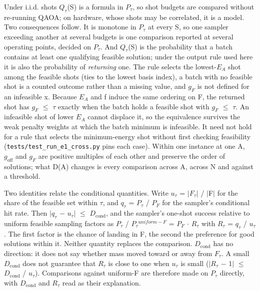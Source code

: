 \documentclass[journal]{IEEEtran}
\begin{document}
Under i.i.d. shots $Q_{\tau}$(S) is a formula in $P_{\tau}$, so shot budgets are compared without re-running QAOA; on hardware, whose shots may be correlated, it is a model. Two consequences follow. It is monotone in $P_{\tau}$ at every S, so one sampler exceeding another at several budgets is one comparison reported at several operating points, decided on $P_{\tau}$. And $Q_{\tau}$(S) is the probability that a batch contains at least one qualifying feasible solution; under the output rule used here it is also the probability of \textit{returning} one. The rule selects the lowest-$E_{A}$ shot among the feasible shots (ties to the lowest basis index), a batch with no feasible shot is a counted outcome rather than a missing value, and $g_{F}$ is not defined for an infeasible x. Because $E_{A}$ and f induce the same ordering on F, the returned shot has $g_{F}$ $\leq$ $\tau$ exactly when the batch holds a feasible shot with $g_{F}$ $\leq$ $\tau$. An infeasible shot of lower $E_{A}$ cannot displace it, so the equivalence survives the weak penalty weights at which the batch minimum is infeasible. It need not hold for a rule that selects the minimum-energy shot without first checking feasibility (\texttt{tests/test\_run\_e1\_cross.py} pins each case). Within one instance at one A, $g_{\mathrm{off}}$ and $g_{F}$ are positive multiples of each other and preserve the order of solutions; what D(A) changes is every comparison across A, across N and against a threshold.


Two identities relate the conditional quantities. Write $u_{\tau}$ = $|$$F_{\tau}$$|$ / $|$F$|$ for the share of the feasible set within $\tau$, and $q_{\tau}$ = $P_{\tau}$ / $P_{F}$ for the sampler's conditional hit rate. Then $|$$q_{\tau}$ $-$ $u_{\tau}$$|$ $\leq$ $D_{\mathrm{cond}}$, and the sampler's one-shot success relative to uniform feasible sampling factors as $P_{\tau}$ / $P_{\tau}$$^{uniform-F}$ = $P_{F}$ $\cdot$ $R_{\tau}$ with $R_{\tau}$ = $q_{\tau}$ / $u_{\tau}$. The first factor is the chance of landing in F, the second the preference for good solutions within it. Neither quantity replaces the comparison. $D_{\mathrm{cond}}$ has no direction: it does not say whether mass moved toward or away from $F_{\tau}$. A small $D_{\mathrm{cond}}$ does not guarantee that $R_{\tau}$ is close to one when $u_{\tau}$ is small ($|$$R_{\tau}$ $-$ 1$|$ $\leq$ $D_{\mathrm{cond}}$ / $u_{\tau}$). Comparisons against uniform-F are therefore made on $P_{\tau}$ directly, with $D_{\mathrm{cond}}$ and $R_{\tau}$ read as their explanation.
\end{document}

